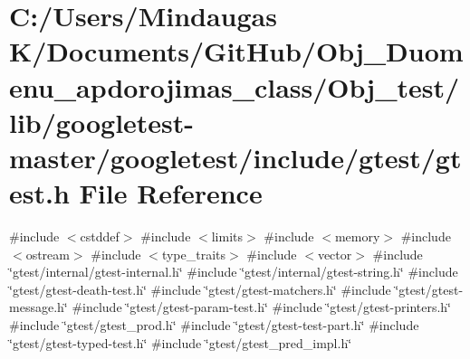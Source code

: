 \hypertarget{_obj__test_2lib_2googletest-master_2googletest_2include_2gtest_2gtest_8h}{}\section{C\+:/\+Users/\+Mindaugas K/\+Documents/\+Git\+Hub/\+Obj\+\_\+\+Duomenu\+\_\+apdorojimas\+\_\+class/\+Obj\+\_\+test/lib/googletest-\/master/googletest/include/gtest/gtest.h File Reference}
\label{_obj__test_2lib_2googletest-master_2googletest_2include_2gtest_2gtest_8h}
{\ttfamily \#include $<$cstddef$>$}\newline
{\ttfamily \#include $<$limits$>$}\newline
{\ttfamily \#include $<$memory$>$}\newline
{\ttfamily \#include $<$ostream$>$}\newline
{\ttfamily \#include $<$type\+\_\+traits$>$}\newline
{\ttfamily \#include $<$vector$>$}\newline
{\ttfamily \#include \char`\"{}gtest/internal/gtest-\/internal.\+h\char`\"{}}\newline
{\ttfamily \#include \char`\"{}gtest/internal/gtest-\/string.\+h\char`\"{}}\newline
{\ttfamily \#include \char`\"{}gtest/gtest-\/death-\/test.\+h\char`\"{}}\newline
{\ttfamily \#include \char`\"{}gtest/gtest-\/matchers.\+h\char`\"{}}\newline
{\ttfamily \#include \char`\"{}gtest/gtest-\/message.\+h\char`\"{}}\newline
{\ttfamily \#include \char`\"{}gtest/gtest-\/param-\/test.\+h\char`\"{}}\newline
{\ttfamily \#include \char`\"{}gtest/gtest-\/printers.\+h\char`\"{}}\newline
{\ttfamily \#include \char`\"{}gtest/gtest\+\_\+prod.\+h\char`\"{}}\newline
{\ttfamily \#include \char`\"{}gtest/gtest-\/test-\/part.\+h\char`\"{}}\newline
{\ttfamily \#include \char`\"{}gtest/gtest-\/typed-\/test.\+h\char`\"{}}\newline
{\ttfamily \#include \char`\"{}gtest/gtest\+\_\+pred\+\_\+impl.\+h\char`\"{}}\newline
